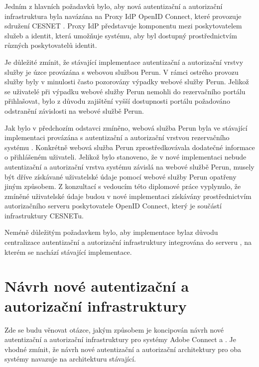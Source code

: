 \documentclass[
  printed, %
  twoside, %
  table,   %
  nolof,     %
  nolot,     %
]{fithesis3}
\begin{document}
\par
Jedním z hlavních požadavků bylo, aby nová autentizační a autorizační infrastruktura byla navázána na Proxy IdP OpenID Connect, které provozuje sdružení CESNET \cite{proxyIdpPresentation}. Proxy IdP představuje komponentu mezi poskytovatelem služeb a identit, která umožňuje systému, aby byl dostupný prostřednictvím různých poskytovatelů identit. 
\par

\par 
Je důležité zmínit, že stávající implementace autentizační a autorizační vrstvy služby  je úzce provázána s webovou službou Perun. V rámci ostrého provozu služby  byly v minulosti často pozorovány výpadky webové služby Perun. Jelikož se uživatelé při výpadku webové služby Perun nemohli do rezervačního portálu  přihlašovat, bylo z důvodu zajištění vyšší dostupnosti portálu  požadováno odstranění závislosti na webové službě Perun. 

\par 

Jak bylo v předchozím odstavci zmíněno, webová služba Perun byla ve stávající implementaci provázána s autentizační a autorizační vrstvou rezervačního systému . Konkrétně webová služba Perun zprostředkovávala dodatečné informace o přihlášeném uživateli. Jelikož bylo stanoveno, že v nové implementaci nebude autentizační a autorizační vrstva systému  závislá na webové službě Perun, musely být dříve získávané uživatelské údaje pomocí webové služby Perun opatřeny jiným způsobem. Z konzultací s vedoucím této diplomové práce vyplynulo, že zmíněné uživatelské údaje budou v nové implementaci získávány prostřednictvím autorizačního serveru poskytovatele OpenID Connect, který je součástí infrastruktury CESNETu.     

\par

Neméně důležitým požadavkem bylo, aby implementace byla\break z důvodu centralizace autentizační a autorizační infrastruktury integrována do serveru , na kterém se nachází stávající implementace. 

\section{Návrh nové autentizační a autorizační infrastruktury}
Zde se budu věnovat otázce, jakým způsobem je koncipován návrh nové autentizační a autorizační infrastruktury pro systémy Adobe Connect a . Je vhodné zmínit, že návrh nové autentizační a autorizační architektury pro oba systémy navazuje na architekturu stávající. 
\end{document}
